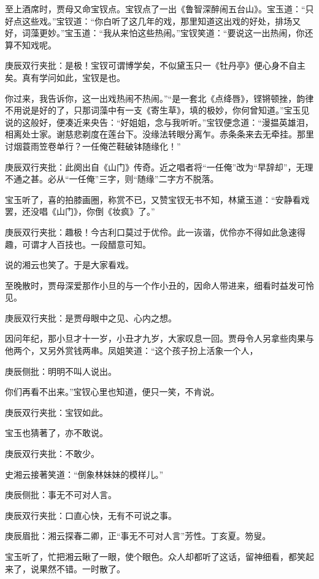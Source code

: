 \begin{parag}
    至上酒席时，贾母又命宝钗点。宝钗点了一出《鲁智深醉闹五台山》。宝玉道：“只好点这些戏。”宝钗道：“你白听了这几年的戏，那里知道这出戏的好处，排场又好，词藻更妙。”宝玉道：“我从来怕这些热闹。”宝钗笑道：“要说这一出热闹，你还算不知戏呢。\begin{note}庚辰双行夹批：是极！宝钗可谓博学矣，不似黛玉只一《牡丹亭》便心身不自主矣。真有学问如此，宝钗是也。\end{note}你过来，我告诉你，这一出戏热闹不热闹。”“是一套北《点绛唇》，铿锵顿挫，韵律不用说是好的了，只那词藻中有一支《寄生草》，填的极妙，你何曾知道。”宝玉见说的这般好，便凑近来央告：“好姐姐，念与我听听。”宝钗便念道：“漫揾英雄泪，相离处士家。谢慈悲剃度在莲台下。没缘法转眼分离乍。赤条条来去无牵挂。那里讨烟蓑雨笠卷单行？一任俺芒鞋破钵随缘化！”\begin{note}庚辰双行夹批：此阕出自《山门》传奇。近之唱者将“一任俺”改为“早辞却”，无理不通之甚。必从“一任俺”三字，则“随缘”二字方不脱落。\end{note}
\end{parag}


\begin{parag}
    宝玉听了，喜的拍膝画圈，称赏不已，又赞宝钗无书不知，林黛玉道：“安静看戏罢，还没唱《山门》，你倒《妆疯》了。”\begin{note}庚辰双行夹批：趣极！今古利口莫过于优伶。此一诙谐，优伶亦不得如此急速得趣，可谓才人百技也。一段醋意可知。\end{note}说的湘云也笑了。于是大家看戏。
\end{parag}


\begin{parag}
    至晚散时，贾母深爱那作小旦的与一个作小丑的，因命人带进来，细看时益发可怜见。\begin{note}庚辰双行夹批：是贾母眼中之见、心内之想。\end{note}因问年纪，那小旦才十一岁，小丑才九岁，大家叹息一回。贾母令人另拿些肉果与他两个，又另外赏钱两串。凤姐笑道：“这个孩子扮上活象一个人，\begin{note}庚辰侧批：明明不叫人说出。\end{note}你们再看不出来。”宝钗心里也知道，便只一笑，不肯说。\begin{note}庚辰双行夹批：宝钗如此。\end{note}宝玉也猜著了，亦不敢说。\begin{note}庚辰双行夹批：不敢少。\end{note}史湘云接著笑道：“倒象林妹妹的模样儿。”\begin{note}庚辰侧批：事无不可对人言。\end{note}\begin{note}庚辰双行夹批：口直心快，无有不可说之事。\end{note}\begin{note}庚辰眉批：湘云探春二卿，正“事无不可对人言”芳性。丁亥夏。笏叟。\end{note}宝玉听了，忙把湘云瞅了一眼，使个眼色。众人却都听了这话，留神细看，都笑起来了，说果然不错。一时散了。
\end{parag}


